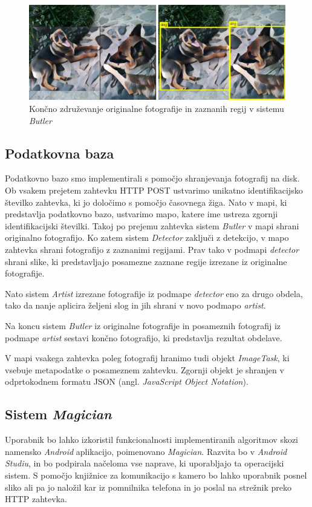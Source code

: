 \documentclass[runningheads,a4paper]{llncs}
\begin{document}
\begin{figure}[H]
\centering
\includegraphics[width=\textwidth, center]{figures/neural_example/merged.png}
\caption{Končno združevanje originalne fotografije in zaznanih regij v sistemu \textit{Butler}}
\label{fig:merged}
\end{figure}

\subsection{Podatkovna baza}
Podatkovno bazo smo implementirali s pomočjo shranjevanja fotografij na disk. Ob vsakem prejetem zahtevku HTTP POST ustvarimo unikatno identifikacijsko številko zahtevka, ki jo določimo s pomočjo časovnega žiga. Nato v mapi, ki predstavlja podatkovno bazo, ustvarimo mapo, katere ime ustreza zgornji identifikacijski številki. Takoj po prejemu zahtevka sistem \textit{Butler} v mapi shrani originalno fotografijo. Ko zatem sistem \textit{Detector} zaključi z detekcijo, v mapo zahtevka shrani fotografijo z zaznanimi regijami. Prav tako v podmapi \textit{detector} shrani slike, ki predstavljajo posamezne zaznane regije izrezane iz originalne fotografije.

Nato sistem \textit{Artist} izrezane fotografije iz podmape \textit{detector} eno za drugo obdela, tako da nanje aplicira željeni slog in jih shrani v novo podmapo \textit{artist}.

Na koncu sistem \textit{Butler} iz originalne fotografije in posameznih fotografij iz podmape \textit{artist} sestavi končno fotografijo, ki predstavlja rezultat obdelave. 

V mapi vsakega zahtevka poleg fotografij hranimo tudi objekt \textit{ImageTask}, ki vsebuje metapodatke o posameznem zahtevku. Zgornji objekt je shranjen v odprtokodnem formatu JSON (angl. \textit{JavaScript Object Notation}).

\subsection{Sistem \textit{Magician}}
Uporabnik bo lahko izkoristil funkcionalnosti implementiranih algoritmov skozi namensko \textit{Android} aplikacijo, poimenovano \textit{Magician}. Razvita bo v \textit{Android Studiu}, in bo podpirala načeloma vse naprave, ki uporabljajo ta operacijski sistem. S pomočjo knjižnice za komunikacijo s kamero \cite{cwac-cam} bo lahko uporabnik posnel sliko ali pa jo naložil kar iz pomnilnika telefona in jo poslal na strežnik preko HTTP zahtevka. 
\end{document}
